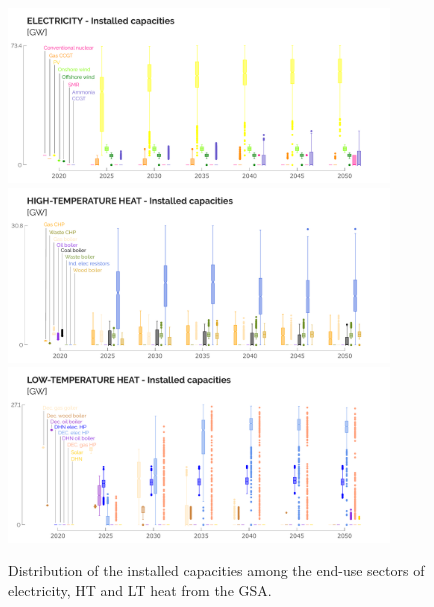 \documentclass[11pt,twoside,a4paper,english]{article}
\begin{document}
\begin{appendices}
\begin{figure}[htbp!]
\centering
\includegraphics[width=0.9\textwidth]{ELECTRICITY_Tech.pdf}
\includegraphics[width=0.9\textwidth]{HT_HEAT_Tech.pdf}
\includegraphics[width=0.9\textwidth]{LT_HEAT_Tech.pdf}
\caption{Distribution of the installed capacities among the end-use sectors of electricity, \gls{HT} and \gls{LT} heat from the \acrfull{GSA}.}
\label{fig:results_uq_tech_cap_ELEC_HT_LT}
\end{figure}


\end{appendices}
\end{document}
